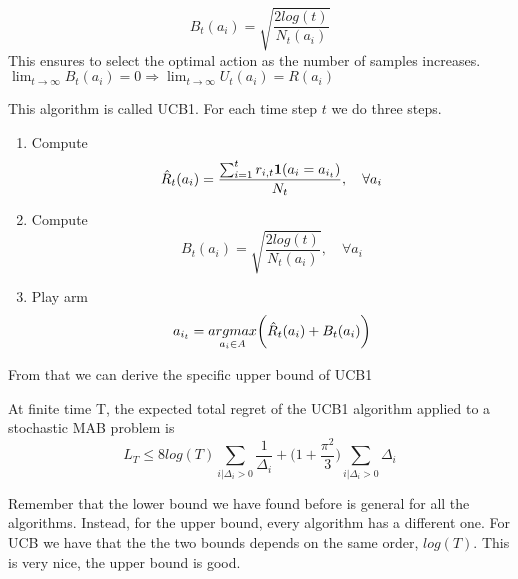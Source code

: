 \documentclass[../main.tex]{subfiles}
\begin{document}
\begin{equation}
    B_t(a_i) = \sqrt{\frac{2log(t)}{N_t(a_i)}}
\end{equation}
This ensures to select the optimal action as the number of samples increases. $\lim_{t \rightarrow \infty} B_t(a_i) = 0 \Rightarrow \lim_{t \rightarrow \infty} U_t(a_i) = R(a_i)$
\par \noindent
This algorithm is called UCB1. For each time step $t$ we do three steps.
\begin{enumerate}
    \item Compute
          \begin{equation*}
              \Hat{R}_t(a_i) = \frac{\sum_{i=1}^t r_{i,t} \mathbf{1}(a_i=a_{i_t})}{N_t}, \quad \forall a_i
          \end{equation*}
    \item Compute
          \begin{equation*}
              B_t(a_i) = \sqrt{\frac{2log(t)}{N_t(a_i)}}, \quad \forall a_i
          \end{equation*}
    \item Play arm
          \begin{equation*}
              a_{i_t} = \underset{a_i \in A}{argmax}\bigg( \Hat{R}_t(a_i) + B_t(a_i) \bigg)
          \end{equation*}
\end{enumerate}
From that we can derive the specific upper bound of UCB1
\begin{theorem}
    At finite time T, the expected total regret of the UCB1 algorithm applied to a
    stochastic MAB problem is
    \begin{equation*}
        L_T \leq 8log(T) \sum_{i|\Delta_i > 0} \frac{1}{\Delta_i} + \bigg( 1+ \frac{\pi^2}{3} \bigg) \sum_{i|\Delta_i > 0} \Delta_i
    \end{equation*}
\end{theorem}
\par \noindent
Remember that the lower bound we have found before is general for all the algorithms. Instead, for the upper bound, every algorithm has a different one. For UCB we have that the the two bounds depends on the same order, $log(T)$. This is very nice, the upper bound is good.
\end{document}

